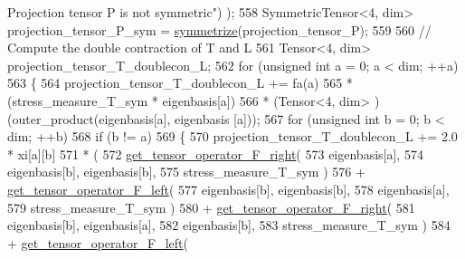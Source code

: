 \begin{DoxyCode}
{       Projection tensor P is not symmetric"}) );
558          SymmetricTensor<4, dim> projection\_tensor\_P\_sym = \hyperlink{functions_8h_afe83e9509497294b7f662b800b6b91ff}{symmetrize}(projection\_tensor\_P);
559 
560         \textcolor{comment}{// Compute the double contraction of T and L}
561          Tensor<4, dim> projection\_tensor\_T\_doublecon\_L;
562          \textcolor{keywordflow}{for} (\textcolor{keywordtype}{unsigned} \textcolor{keywordtype}{int} a = 0; a < dim; ++a)
563          \{
564             projection\_tensor\_T\_doublecon\_L += fa(a)
565                                                * (stress\_measure\_T\_sym * eigenbasis[a])
566                                                * (Tensor<4, dim> ) (outer\_product(eigenbasis[a], eigenbasis
      [a]));
567             \textcolor{keywordflow}{for} (\textcolor{keywordtype}{unsigned} \textcolor{keywordtype}{int} b = 0; b < dim; ++b)
568                 \textcolor{keywordflow}{if} (b != a)
569                 \{
570                     projection\_tensor\_T\_doublecon\_L += 2.0 * xi[a][b]
571                                                        * (
572                                                             
      \hyperlink{functions_8h_acfd8da38df3766246f7bcf0e736ad9f4}{get\_tensor\_operator\_F\_right}(
573                                                                 eigenbasis[a],
574                                                                 eigenbasis[b], eigenbasis[b],
575                                                                 stress\_measure\_T\_sym )
576                                                           + 
      \hyperlink{functions_8h_a6f9435c7728281851248d3537c100e7d}{get\_tensor\_operator\_F\_left}(
577                                                                 eigenbasis[b], eigenbasis[b],
578                                                                 eigenbasis[a],
579                                                                 stress\_measure\_T\_sym )
580                                                           + 
      \hyperlink{functions_8h_acfd8da38df3766246f7bcf0e736ad9f4}{get\_tensor\_operator\_F\_right}(
581                                                                 eigenbasis[b], eigenbasis[a],
582                                                                 eigenbasis[b],
583                                                                 stress\_measure\_T\_sym )
584                                                           + 
      \hyperlink{functions_8h_a6f9435c7728281851248d3537c100e7d}{get\_tensor\_operator\_F\_left}(

\end{DoxyCode}
